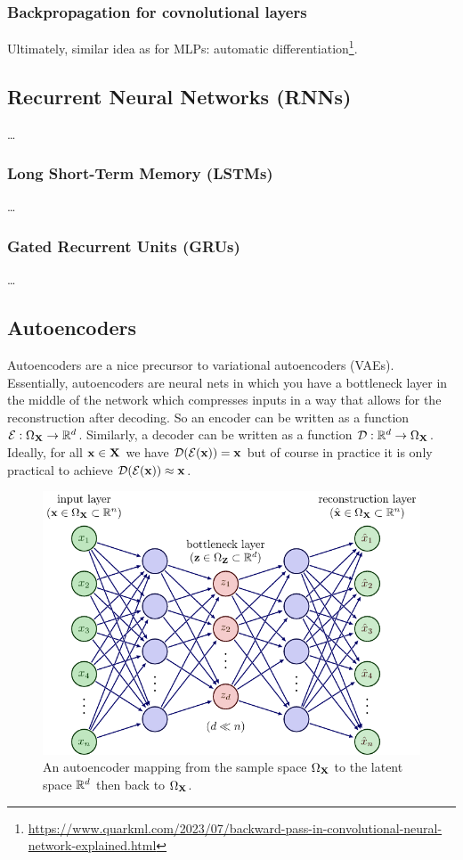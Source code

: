 \documentclass[11pt]{article}
\begin{document}
\subsubsection{Backpropagation for covnolutional layers}
Ultimately, similar idea as for MLPs: automatic differentiation\footnote{\url{https://www.quarkml.com/2023/07/backward-pass-in-convolutional-neural-network-explained.html}}.

\subsection{Recurrent Neural Networks (RNNs)}
\dots

\subsubsection{Long Short-Term Memory (LSTMs)}
\dots

\subsubsection{Gated Recurrent Units (GRUs)}
\dots

\subsection{Autoencoders}
\label{sec:autoencoders}
Autoencoders are a nice precursor to variational autoencoders (VAEs). Essentially, autoencoders are neural nets in which you have a bottleneck layer in the middle of the network which compresses inputs in a way that allows for the reconstruction after decoding. So an encoder can be written as a function $\mathcal{E}:\Omega_{\mathbf{X}}\rightarrow\mathbb{R}^d$. Similarly, a decoder can be written as a function $\mathcal{D}:\mathbb{R}^d\rightarrow\Omega_{\mathbf{X}}$. Ideally, for all $\mathbf{x}\in\mathbf{X}$ we have $\mathcal{D}(\mathcal{E}(\mathbf{x}))=\mathbf{x}$ but of course in practice it is only practical to achieve $\mathcal{D}(\mathcal{E}(\mathbf{x}))\approx\mathbf{x}$.

\begin{figure}[ht]
    \centering
    \includegraphics{./figures/neural_nets/autoencoder.pdf}
    \caption{\centering An autoencoder mapping from the sample space $\Omega_{\mathbf{X}}$ to the latent space $\mathbb{R}^d$ then back to $\Omega_{\mathbf{X}}$.}
    \label{fig:autoencoder}
\end{figure}
\end{document}
